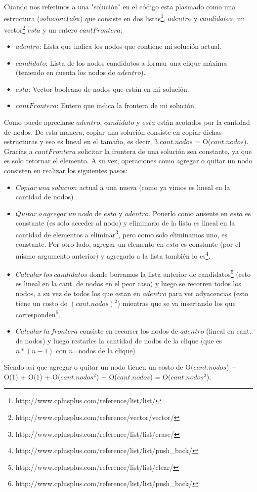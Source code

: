  Cuando nos referimos a una "solución" en el código esta plasmado como una estructura ($solucionTabu$) que consiste en dos listas\footnote{http://www.cplusplus.com/reference/list/list/}, $adentro$ y $candidatos$, un vector\footnote{http://www.cplusplus.com/reference/vector/vector/} $esta$ y un entero $cantFrontera$:
\begin{itemize}
 \item $adentro$: Lista que indica los nodos que contiene mi solución actual.
 \item $candidato$: Lista de los nodos candidatos a formar una clique máxima (teniendo en cuenta los nodos de $adentro$). 
 \item $esta$: Vector booleano de nodos que están en mi solución.
 \item $cantFrontera$: Entero que indica la frontera de mi solución.\newline
\end{itemize}
 Como puede apreciarse $adentro$, $candidato$ y $esta$ están acotados por la cantidad de nodos. De esta manera, copiar una solución consiste en copiar dichas estructuras y eso es lineal en el tamaño, es decir, 3.$cant.nodos$ = O($cant.nodos$). 
 Gracias a $cantFrontera$ solicitar la frontera de una solución sea constante, ya que es solo retornar el elemento. A su vez, operaciones como agregar o quitar un nodo consisten en realizar los siguientes pasos: \newline
\begin{itemize}
 \item $Copiar\ una\ solucion$ actual a una nueva (como ya vimos es lineal en la cantidad de nodos)
 \item $Quitar\ o\ agregar\ un\ nodo$ de $esta$ y $adentro$. Ponerlo como ausente en $esta$ es constante (es solo acceder al nodo) y eliminarlo de la lista es lineal en la cantidad de elementos a eliminar\footnote{http://www.cplusplus.com/reference/list/list/erase/}, pero como solo eliminamos uno, es constante. Por otro lado, agregar un elemento en $esta$ es constante (por el mismo argumento anterior) y agregarlo a la lista también lo es\footnote{http://www.cplusplus.com/reference/list/list/push_back/}.
 \item $Calcular\ los\ candidatos$ donde borramos la lista anterior de candidatos\footnote{http://www.cplusplus.com/reference/list/list/clear/} (esto es lineal en la cant. de nodos en el peor caso) y luego se recorren todos los nodos, a su vez de todos los que estan en $adentro$ para ver adyacencias (esto tiene un costo de $(cant.nodos)$$^{2}$) mientras que se va insertando los que corresponden\footnote{http://www.cplusplus.com/reference/list/list/push_back/}.
 \item $Calcular\ la\ frontera$ consiste en recorrer los nodos de $adentro$ (lineal en cant. de nodos) y luego restarles la cantidad de nodos de la clique (que es $n*(n-1)$ con $n$=nodos de la clique)
\end{itemize}
 Siendo así que agregar o quitar un nodo tienen un costo de O($cant.nodos$) + O(1) + O(1) + O($cant.nodos$$^{2}$) + O($cant.nodos$) = O($cant.nodos$$^{2}$).\newline

